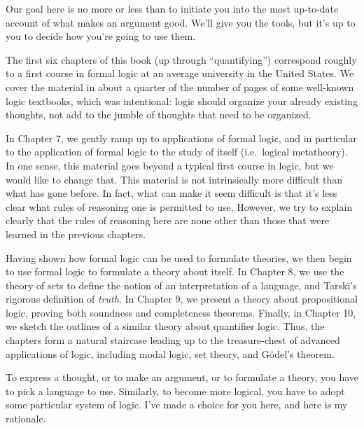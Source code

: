 \documentclass[fleqn]{tufte-book}
\numberwithin{prop}{chapter}
\theoremstyle{definition}
\numberwithin{exercise}{chapter}
\begin{document}
Our goal here is no more or less than to initiate you into the most
up-to-date account of what makes an argument good.  We'll give you the
tools, but it's up to you to decide how you're going to use them.

 The first six
chapters of this book (up through ``quantifying'') correspond roughly
to a first course in formal logic at an average university in the
United States.  We cover the material in about a quarter of the number
of pages of some well-known logic textbooks, which was intentional:
logic should organize your already existing thoughts, not add to the
jumble of thoughts that need to be organized.

In Chapter 7, we gently ramp up to applications of formal logic, and
in particular to the application of formal logic to the study of
itself (i.e.\ logical metatheory).  In one sense, this material goes
beyond a typical first course in logic, but we would like to change
that.  This material is not intrinsically more difficult than what has
gone before.  In fact, what can make it seem difficult is that it's
less clear what rules of reasoning one is permitted to use.  However,
we try to explain clearly that the rules of reasoning here are none
other than those that were learned in the previous chapters.

Having shown how formal logic can be used to formulate theories, we
then begin to use formal logic to formulate a theory about itself.  In
Chapter 8, we use the theory of sets to define the notion of an
interpretation of a language, and Tarski's rigorous definition of {\it
  truth}.  In Chapter 9, we present a theory about propositional
logic, proving both soundness and completeness theorems.  Finally, in
Chapter 10, we sketch the outlines of a similar theory about
quantifier logic.  Thus, the chapters form a natural staircase leading
up to the treasure-chest of advanced applications of logic, including
modal logic, set theory, and G{\"o}del's theorem.

 To express a thought, or to make an
argument, or to formulate a theory, you have to pick a language to
use.  Similarly, to become more logical, you have to adopt some
particular system of logic.  I've made a choice for you here, and here
is my rationale.
\end{document}
